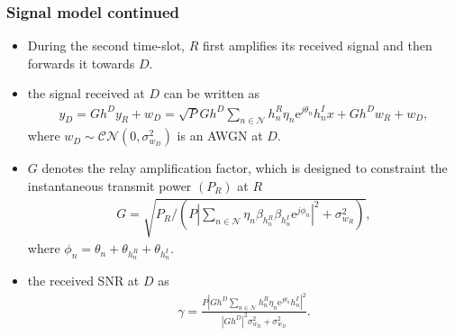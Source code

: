 \documentclass[article,mathserif,10pt,envcountsect]{beamer}
\renewcommand{\exp}[1]{\mathrm{e}^{#1}}
\begin{document}
\begin{frame}
	\frametitle{Signal model continued}
	\begin{itemize}
		\item During the second time-slot, $R$ first amplifies its received signal and then forwards it towards $D$. 
		\item the  signal received at $D$ can be written as 
		\begin{eqnarray}\label{eqn:D_rx_signl}
		y_D =  G h^D y_R + w_D = \sqrt{P} G h^D\sum\nolimits_{n \in{\mathcal{N}}}  h_{n}^R  \eta_{n} \exp{j \theta_{n}} h_{n}^I x + G h^D w_R + w_D, \nonumber
		\end{eqnarray}
		where $w_D \sim \mathcal{CN}\left(0,\sigma_{w_D}^2\right)$  is an AWGN at $D$.
	
	\item $G$ denotes the relay amplification factor, which is designed to constraint the instantaneous transmit power $(P_R)$ at $R$
	\begin{eqnarray}\label{eqn:R_gain}
	G = \sqrt{{P_R}\Bigg/\left({P \left|\sum\nolimits_{n \in{\mathcal{N}}} \eta_{n} \beta_{h_{n}^R}  \beta_{h_{n}^I} \exp{j \phi_{n}}  \right|^2+\sigma_{w_R}^2}\right)}, \nonumber
	\end{eqnarray}
	where $\phi_{n} = \theta_{n}+ \theta_{h_{n}^R}+ \theta_{h_{n}^I}$.
	
	\item the received SNR at $D$ as 
	\begin{eqnarray}\label{eqn:snr}
	\gamma =  \frac{P \left| G h^D \sum_{n \in \mathcal{N}} h_{n}^R \eta_{n} \exp{j\theta_{n}} h_{n}^I \right|^2}{\left|G h^D\right|^2 \sigma_{w_R}^2 + \sigma_{w_D}^2}. \nonumber 
	\end{eqnarray}
	
	\end{itemize}
\end{frame}	
\end{document}
